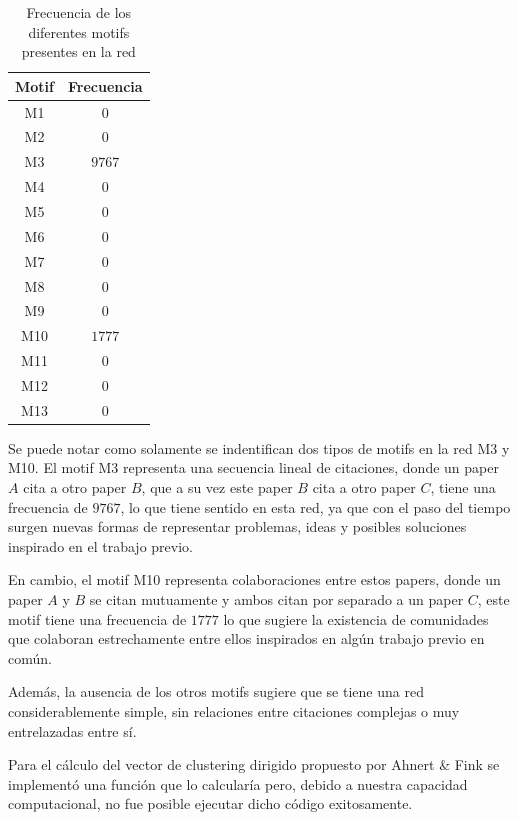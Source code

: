 \documentclass[12pt]{article}
\begin{document}
\begin{enumerate}
    \begin{table}[H]
        \centering
        \begin{tabular}{|c|c|}
            \hline
            \textbf{Motif} & \textbf{Frecuencia} \\ \hline
            M1 & $0$ \\ \hline
            M2 & $0$ \\ \hline
            M3 & $9767$ \\ \hline
            M4 & $0$ \\ \hline
            M5 & $0$ \\ \hline
            M6 & $0$ \\ \hline
            M7 & $0$ \\ \hline
            M8 & $0$ \\ \hline
            M9 & $0$ \\ \hline
            M10 & $1777$ \\ \hline
            M11 & $0$ \\ \hline
            M12 & $0$ \\ \hline
            M13 & $0$ \\ \hline
        \end{tabular}
        \caption{Frecuencia de los diferentes motifs presentes en la red}
        \label{tab:motifs}
    \end{table}

    Se puede notar como solamente se indentifican dos tipos de motifs en la red M3 y M10. El motif M3 representa una secuencia lineal de citaciones, donde un paper $A$ cita a otro paper $B$, que a su vez este paper $B$ cita a otro paper $C$, tiene una frecuencia de $9767$, lo que tiene sentido en esta red, ya que con el paso del tiempo surgen nuevas formas de representar problemas, ideas y posibles soluciones inspirado en el trabajo previo.
    
    En cambio, el motif M10 representa colaboraciones entre estos papers, donde un paper $A$ y $B$ se citan mutuamente y ambos citan por separado a un paper $C$, este motif tiene una frecuencia de $1777$ lo que sugiere la existencia de comunidades que colaboran estrechamente entre ellos inspirados en algún trabajo previo en común.

    Además, la ausencia de los otros motifs sugiere que se tiene una red considerablemente simple, sin relaciones entre citaciones complejas o muy entrelazadas entre sí.

    Para el cálculo del vector de clustering dirigido propuesto por Ahnert \& Fink se implementó una función que lo calcularía pero, debido a nuestra capacidad computacional, no fue posible ejecutar dicho código exitosamente.
    

\end{enumerate}
\end{document}
